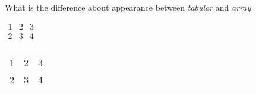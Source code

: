 What is the difference about appearance between \emph{tabular} and \emph{array}

$
    \begin{array}{ccc}
        1 & 2 & 3 \\
        2 & 3 & 4 \\
    \end{array}
$
\begin{tabular}{ccc}
1 & 2 & 3 \\
2 & 3 & 4
\end{tabular}